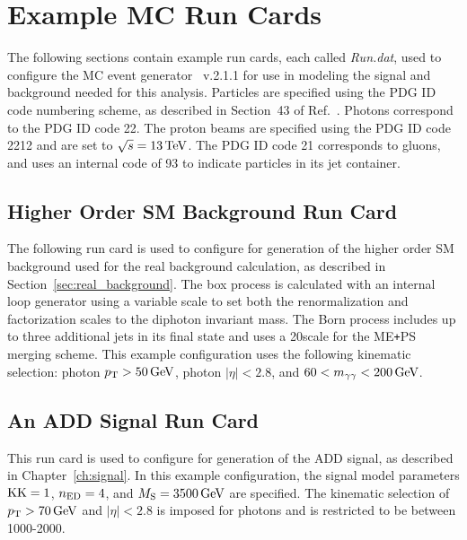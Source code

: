 \chapter{Example MC Run Cards}\label{ch:appendix_run_card}

The following sections contain example run cards, each called \textit{Run.dat}, used to configure the MC event generator \SHERPA~v.2.1.1 for use in modeling the signal and background needed for this analysis. Particles are specified using the PDG ID code numbering scheme, as described in Section~43 of Ref.~\cite{Tanabashi:2018oca}. Photons correspond to the PDG ID code 22. The proton beams are specified using the PDG ID code 2212 and are set to $\sqrt{s} = 13\,\text{Te\hspace{-.08em}V}$. The PDG ID code 21 corresponds to gluons, and \SHERPA uses an internal code of 93 to indicate particles in its jet container.

\section{Higher Order SM Background Run Card}\label{sec:SM_run_card}

The following run card is used to configure \SHERPA for generation of the higher order SM background used for the real background calculation, as described in Section~\ref{sec:real_background}. The box process is calculated with an internal loop generator using a variable scale to set both the renormalization and factorization scales to the diphoton invariant mass. The Born process includes up to three additional jets in its final state and uses a 20\GeV scale for the ME\texttt{+}PS merging scheme. This example configuration uses the following kinematic selection: photon $p_{\mathrm{T}}>50\,\text{Ge\hspace{-.08em}V}$, photon $|\eta|<2.8$, and $60 < m_{\gamma\gamma} < 200\,\text{Ge\hspace{-.08em}V}$.

\pagebreak
{}


\pagebreak
\section{An ADD Signal Run Card}\label{ch:ADD_run_card}

This run card is used to configure \SHERPA for generation of the ADD signal, as described in Chapter~\ref{ch:signal}. In this example configuration, the signal model parameters $\mathrm{KK}=1$, $n_{\rm ED} =4$, and $M_{\rm S} = 3500\,\text{Ge\hspace{-.08em}V}$ are specified. The kinematic selection of $p_{\mathrm{T}}>70\,\text{Ge\hspace{-.08em}V}$ and $|\eta|<2.8$ is imposed for photons and \Mgg is restricted to be between 1000-2000\GeV. 

